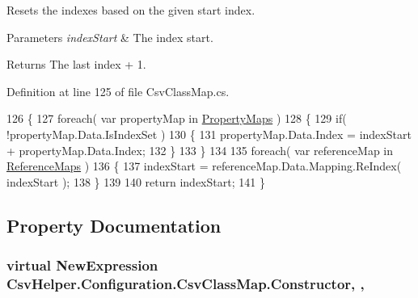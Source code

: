 Resets the indexes based on the given start index. 


\begin{DoxyParams}{Parameters}
{\em index\-Start} & The index start.\\
\hline
\end{DoxyParams}
\begin{DoxyReturn}{Returns}
The last index + 1.
\end{DoxyReturn}


Definition at line 125 of file Csv\-Class\-Map.\-cs.


\begin{DoxyCode}
126         \{
127             \textcolor{keywordflow}{foreach}( var propertyMap \textcolor{keywordflow}{in} \hyperlink{a00060_a9580e897abcba144f3101eb983348e25}{PropertyMaps} )
128             \{
129                 \textcolor{keywordflow}{if}( !propertyMap.Data.IsIndexSet )
130                 \{
131                     propertyMap.Data.Index = indexStart + propertyMap.Data.Index;
132                 \}
133             \}
134 
135             \textcolor{keywordflow}{foreach}( var referenceMap \textcolor{keywordflow}{in} \hyperlink{a00060_a6dfbf8f743b16d2ec83edef865ea2d9e}{ReferenceMaps} )
136             \{
137                 indexStart = referenceMap.Data.Mapping.ReIndex( indexStart );
138             \}
139 
140             \textcolor{keywordflow}{return} indexStart;
141         \}
\end{DoxyCode}


\subsection{Property Documentation}
\hypertarget{a00060_ae8038b36db7584ef1a73852fcc46404b}{
\subsubsection[{Constructor}]{\setlength{\rightskip}{0pt plus 5cm}virtual New\-Expression Csv\-Helper.\-Configuration.\-Csv\-Class\-Map.\-Constructor\hspace{0.3cm}{\ttfamily [get]}, {\ttfamily [set]}, {\ttfamily [inherited]}}}\label{a00060_ae8038b36db7584ef1a73852fcc46404b}


